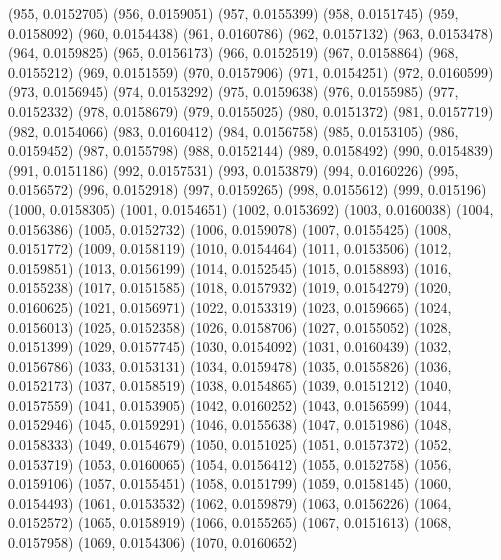 {					(955, 0.0152705)
					(956, 0.0159051)
					(957, 0.0155399)
					(958, 0.0151745)
					(959, 0.0158092)
					(960, 0.0154438)
					(961, 0.0160786)
					(962, 0.0157132)
					(963, 0.0153478)
					(964, 0.0159825)
					(965, 0.0156173)
					(966, 0.0152519)
					(967, 0.0158864)
					(968, 0.0155212)
					(969, 0.0151559)
					(970, 0.0157906)
					(971, 0.0154251)
					(972, 0.0160599)
					(973, 0.0156945)
					(974, 0.0153292)
					(975, 0.0159638)
					(976, 0.0155985)
					(977, 0.0152332)
					(978, 0.0158679)
					(979, 0.0155025)
					(980, 0.0151372)
					(981, 0.0157719)
					(982, 0.0154066)
					(983, 0.0160412)
					(984, 0.0156758)
					(985, 0.0153105)
					(986, 0.0159452)
					(987, 0.0155798)
					(988, 0.0152144)
					(989, 0.0158492)
					(990, 0.0154839)
					(991, 0.0151186)
					(992, 0.0157531)
					(993, 0.0153879)
					(994, 0.0160226)
					(995, 0.0156572)
					(996, 0.0152918)
					(997, 0.0159265)
					(998, 0.0155612)
					(999, 0.015196)
					(1000, 0.0158305)
					(1001, 0.0154651)
					(1002, 0.0153692)
					(1003, 0.0160038)
					(1004, 0.0156386)
					(1005, 0.0152732)
					(1006, 0.0159078)
					(1007, 0.0155425)
					(1008, 0.0151772)
					(1009, 0.0158119)
					(1010, 0.0154464)
					(1011, 0.0153506)
					(1012, 0.0159851)
					(1013, 0.0156199)
					(1014, 0.0152545)
					(1015, 0.0158893)
					(1016, 0.0155238)
					(1017, 0.0151585)
					(1018, 0.0157932)
					(1019, 0.0154279)
					(1020, 0.0160625)
					(1021, 0.0156971)
					(1022, 0.0153319)
					(1023, 0.0159665)
					(1024, 0.0156013)
					(1025, 0.0152358)
					(1026, 0.0158706)
					(1027, 0.0155052)
					(1028, 0.0151399)
					(1029, 0.0157745)
					(1030, 0.0154092)
					(1031, 0.0160439)
					(1032, 0.0156786)
					(1033, 0.0153131)
					(1034, 0.0159478)
					(1035, 0.0155826)
					(1036, 0.0152173)
					(1037, 0.0158519)
					(1038, 0.0154865)
					(1039, 0.0151212)
					(1040, 0.0157559)
					(1041, 0.0153905)
					(1042, 0.0160252)
					(1043, 0.0156599)
					(1044, 0.0152946)
					(1045, 0.0159291)
					(1046, 0.0155638)
					(1047, 0.0151986)
					(1048, 0.0158333)
					(1049, 0.0154679)
					(1050, 0.0151025)
					(1051, 0.0157372)
					(1052, 0.0153719)
					(1053, 0.0160065)
					(1054, 0.0156412)
					(1055, 0.0152758)
					(1056, 0.0159106)
					(1057, 0.0155451)
					(1058, 0.0151799)
					(1059, 0.0158145)
					(1060, 0.0154493)
					(1061, 0.0153532)
					(1062, 0.0159879)
					(1063, 0.0156226)
					(1064, 0.0152572)
					(1065, 0.0158919)
					(1066, 0.0155265)
					(1067, 0.0151613)
					(1068, 0.0157958)
					(1069, 0.0154306)
					(1070, 0.0160652)
}
